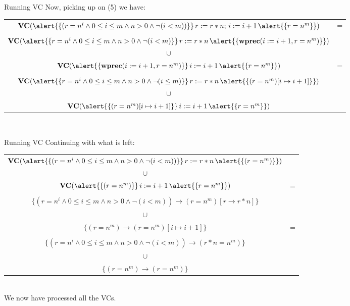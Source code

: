 \documentclass[aspectratio=169]{beamer}
\begin{document}
\begin{slide}{Running VC}
Now, picking up on (5) we have:\\\vspace{0.5cm}
\small{
\begin{tabular}{cc}
  $\textbf{VC}(\alert{\{(r = n^i \land 0 \leq i \leq m \land n > 0 \land \neg(i < m))\}}\,r := r * n;\,i := i +1\,\alert{\{r = n^m\}})$ & =\\
  &\\
  $\textbf{VC}(\alert{\{r = n^i \land 0 \leq i \leq m \land n > 0 \land \neg(i < m)\}}\,r := r * n\,\alert{\{\textbf{wprec}(i := i + 1,r = n^m)\}})$\\
  $\cup$\\
  $\textbf{VC}(\alert{\{\textbf{wprec}(i := i + 1,r = n^m)\}}\,i := i + 1\,\alert{\{r = n^m\}})$ & =\\
  &\\
  $\textbf{VC}(\alert{\{r = n^i \land 0 \leq i \leq m \land n > 0 \land \neg(i \leq m)\}}\,r := r * n\,\alert{\{(r = n^m)[i \mapsto i + 1]\}})$\\
  $\cup$\\
  $\textbf{VC}(\alert{\{(r = n^m)[i \mapsto i + 1]\}}\,i := i + 1\,\alert{\{r = n^m\}})$
\end{tabular}}\\\vspace{0.3cm}
\end{slide}

\begin{slide}{Running VC}
Continuing with what is left:\\\vspace{0.5cm}
\small{
\begin{tabular}{cc}
 $\textbf{VC}(\alert{\{(r = n^i \land 0 \leq i \leq m \land n > 0 \land \neg(i < m))\}}\,r := r * n\,\alert{\{(r = n^m)\}})$\\
  $\cup$\\
  $\textbf{VC}(\alert{\{(r = n^m)\}}\,i := i + 1\,\alert{\{r = n^m\}})$ & =\\
  &\\
  $\{(r = n^i \land 0 \leq i \leq m \land n > 0 \land \neg(i < m)) \to (r = n^m)[r \to r*n]\}$\\
  $\cup$\\
  $\{(r = n^m) \to (r = n^m)[i \mapsto i + 1]\}$ & =\\
  &\\
  $\{(r = n^i \land 0 \leq i \leq m \land n > 0 \land \neg(i < m)) \to (r*n = n^m)\}$\\
  $\cup$\\
  $\{(r = n^m) \to (r = n^m)\}$
\end{tabular}}\\\vspace{0.3cm}
We now have processed all the VCs. 
\end{slide}
\end{document}
